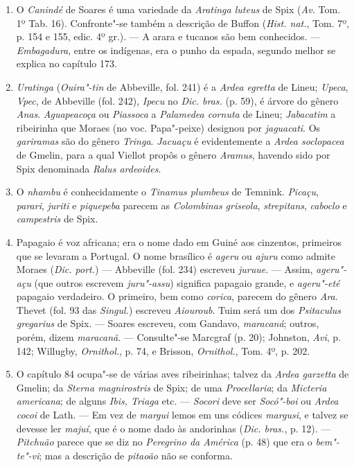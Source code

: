 \begin{enumerate}
\item O \textit{Canindé} de Soares é uma variedade da \textit{Aratinga luteus} de Spix (\textit{Av.} Tom. 1º 
Tab. 16). Confronte"-se também a descrição de Buffon (\textit{Hist. nat.}, Tom. 7º, p. 154 e 155, edic. 4º gr.). 
--- A arara e tucanos são bem conhecidos. --- \textit{Embagadura}, entre os 
indígenas, era o punho da espada, segundo melhor se explica no capítulo 173.

\item \textit{Uratinga} (\textit{Ouira"-tin} de Abbeville, fol. 241) é a \textit{Ardea egretta} de Lineu; 
\textit{Upeca}, \textit{Vpec}, de Abbeville (fol. 242), \textit{Ipecu} no \textit{Dic. bras.} (p. 59), é árvore do gênero \textit{Anas}.
\textit{Aguapeacoça} ou \textit{Piassoca} a \textit{Palamedea cornuta} de Lineu; 
\textit{Jabacatim} a ribeirinha que Moraes (no voc. Papa"-peixe) designou por \textit{jaguacati}. Os 
\textit{gariramas} são do gênero \textit{Tringa}. \textit{Jacuaçu} é evidentemente a \textit{Ardea soclopacea} de Gmelin, 
para a qual Viellot propôs o gênero \textit{Aramus}, havendo sido por Spix denominada \textit{Ralus ardeoides}.

\item O \textit{nhambu} é conhecidamente o \textit{Tinamus plumbeus} de Temnink. \textit{Picaçu}, \textit{parari}, 
\textit{juriti} e \textit{piquepeba} parecem as \textit{Colombinas griseola},
\textit{strepitans}, \textit{caboclo} e \textit{campestris} de Spix.

\item Papagaio é voz africana; era o nome dado em Guiné aos cinzentos, primeiros que 
se levaram a Portugal. O nome brasílico é \textit{ageru} ou \textit{ajuru} como admite Moraes (\textit{Dic. 
port.}) --- Abbeville (fol. 234) escreveu \textit{juruue}. --- Assim, \textit{ageru"-açu} 
(que outros escrevem \textit{juru"-assu}) significa papagaio
grande, e \textit{ageru"-eté} papagaio verdadeiro. O primeiro, bem como \textit{corica},
parecem do gênero \textit{Ara}. Thevet (fol. 93 das \textit{Singul.}) escreveu \textit{Aiouroub}.
Tuim será um dos \textit{Psitaculus gregarius} de Spix. --- Soares escreveu, com
Gandavo, \textit{maracaná}; outros, porém, dizem \textit{maracanã}. --- Consulte"-se Marcgraf
(p. 20); Johnston, \textit{Avi}, p. 142; Willugby, \textit{Ornithol.}, p. 74, e Brisson, 
\textit{Ornithol.}, Tom. 4º, p. 202.

\item  O capítulo 84 ocupa"-se de várias aves ribeirinhas; talvez da \textit{Ardea garzetta}
de Gmelin; da \textit{Sterna magnirostris} de Spix; de uma \textit{Procellaria};
da \textit{Micteria americana}; de alguns \textit{Ibis, Triaga} etc. --- \textit{Socori} deve ser \textit{Socó"-boi} 
ou \textit{Ardea cocoi} de Lath. --- Em vez de \textit{margui} lemos em uns códices \textit{margusi}, 
e talvez se devesse ler \textit{majuí}, que é o nome dado às andorinhas
(\textit{Dic. bras.}, p. 12). --- \textit{Pitchuão} parece que se diz no \textit{Peregrino da América} (p.
48) que era o \textit{bem"-te"-vi}; mas a descrição de \textit{pitaoão} não se conforma.


\end{enumerate}
